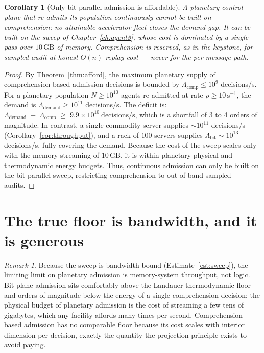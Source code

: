 \documentclass[11pt,oneside]{book}
\theoremstyle{definition}
\theoremstyle{plain}
\newtheorem{corollary}[theorem]{Corollary}
\theoremstyle{remark}
\newtheorem*{remark}{Remark}
\begin{document}
\begin{corollary}[Only bit-parallel admission is affordable]\label{cor:onlybit}
A planetary control plane that re-admits its population continuously cannot be built on comprehension: no attainable accelerator fleet closes the demand gap. %
It can be built on the sweep of Chapter~\ref{ch:agent8}, whose cost is dominated by a single pass over $10\,\mathrm{GB}$ of memory. %
Comprehension is reserved, as in the keystone, for \emph{sampled audit} at honest $O(n)$ replay cost --- never for the per-message path. %
\end{corollary}

\begin{proof}
By Theorem~\ref{thm:afford}, the maximum planetary supply of comprehension-based admission decisions is bounded by $\Lambda_{\text{comp}} \le 10^9$ decisions/s. %
For a planetary population $N \ge 10^{10}$ agents re-admitted at rate $\rho \ge 10\,\mathrm{s}^{-1}$, the demand is $\Lambda_{\text{demand}} \ge 10^{11}$ decisions/s. %
The deficit is: $\Lambda_{\text{demand}} \;-\; \Lambda_{\text{comp}} \;\ge\; 9.9 \times 10^{10}\ \text{decisions/s}$, which is a shortfall of 3 to 4 orders of magnitude. %
In contrast, a single commodity server supplies $\sim 10^{11}$ decisions/s (Corollary~\ref{cor:throughput}), and a rack of $100$ servers supplies $\Lambda_{\text{bit}} \sim 10^{13}$ decisions/s, fully covering the demand. %
Because the cost of the sweep scales only with the memory streaming of $10\,\mathrm{GB}$, it is within planetary physical and thermodynamic energy budgets. %
Thus, continuous admission can only be built on the bit-parallel sweep, restricting comprehension to out-of-band sampled audits. %
\end{proof}

\section{The true floor is bandwidth, and it is generous}

\begin{remark}
Because the sweep is bandwidth-bound (Estimate~\ref{est:sweep}), the limiting limit on planetary admission is memory-system throughput, not logic. %
Bit-plane admission sits comfortably above the Landauer thermodynamic floor and orders of magnitude below the energy of a single comprehension decision; the physical budget of planetary admission is the cost of streaming a few tens of gigabytes, which any facility affords many times per second. %
Comprehension-based admission has no comparable floor because its cost scales with interior dimension per decision, exactly the quantity the projection principle exists to avoid paying. %
\end{remark}
\end{document}
